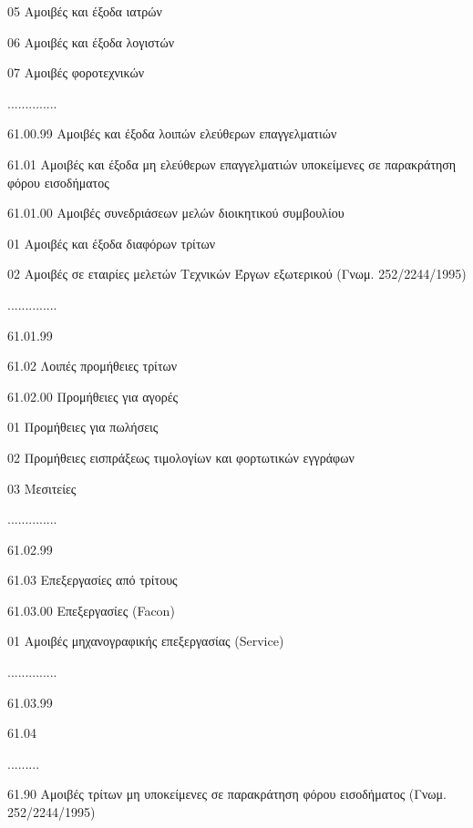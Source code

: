 \documentclass[A4,10pt,greek]{book}
\begin{document}
                                05   Αμοιβές και έξοδα ιατρών

                                06   Αμοιβές και έξοδα λογιστών

                                07   Αμοιβές φοροτεχνικών

                     ..............

                     61.00.99       Αμοιβές και έξοδα λοιπών ελεύθερων επαγγελματιών

        61.01   Αμοιβές και έξοδα μη ελεύθερων επαγγελματιών υποκείμενες σε
                     παρακράτηση φόρου εισοδήματος

                     61.01.00    Αμοιβές συνεδριάσεων μελών διοικητικού συμβουλίου

                                01   Αμοιβές και έξοδα διαφόρων τρίτων

                                02   Αμοιβές σε εταιρίες μελετών Τεχνικών Έργων εξωτερικού
                                        (Γνωμ. 252/2244/1995)

                     ..............

                     61.01.99

       61.02   Λοιπές προμήθειες τρίτων

                     61.02.00   Προμήθειες για αγορές

                                01   Προμήθειες για πωλήσεις

                                02   Προμήθειες εισπράξεως τιμολογίων και φορτωτικών εγγράφων

                                03   Μεσιτείες

                     ..............

                     61.02.99

        61.03   Επεξεργασίες από τρίτους

                     61.03.00    Επεξεργασίες (Facon)

                                01   Αμοιβές μηχανογραφικής επεξεργασίας (Service)

                     ..............

                     61.03.99

        61.04

        .........

        61.90   Αμοιβές τρίτων μη υποκείμενες σε παρακράτηση φόρου εισοδήματος
                    (Γνωμ. 252/2244/1995)
\end{document}
